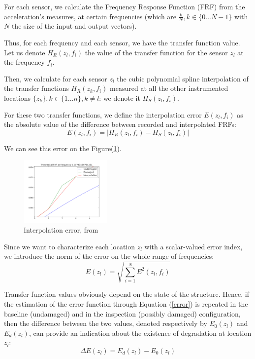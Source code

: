\documentclass[journal]{IEEEtran}
\begin{document}
For each sensor, we calculate the Frequency Response Function (FRF) from the acceleration's measures, at certain frequencies 
(which are $\frac{k}{N}, k \in \{0 ... N-1\}$ with $N$ the size of the input and output vectors).

Thus, for each frequency and each sensor, we have the transfer function value. Let us denote $H_R(z_l,f_i)$ the value of the transfer function for  the sensor $z_l$ at the frequency $f_i$.

Then, we calculate for each sensor $z_l$ the cubic polynomial spline interpolation of the transfer functions $H_R(z_k,f_i)$ measured at all 
the other instrumented locations $\{z_k\}, k\in \{1 ... n\}, k \neq l$: we denote it $H_S(z_l,f_i)$.

For these two transfer functions, we define the interpolation error $E(z_l,f_i)$ as the absolute value of the difference between recorded and interpolated FRFs:
\begin{equation}
E(z_l,f_i) = | H_R(z_l,f_i) - H_S(z_l,f_i) |
\end{equation}

We can see this error on the Figure(\ref{interpolation_error}).


\begin{figure}[h!]
  \centering
  \includegraphics[width=0.4\textwidth]{images/interpolation.png}
  \caption{Interpolation error, from \cite{dilena2015damage}}
  \label{interpolation_error}
\end{figure}

Since we want to characterize each location $z_l$ with a scalar-valued error index, we introduce the norm of the error on the whole range of
frequencies:
\begin{equation}
E(z_l) = \sqrt{  \sum\limits_{i=1}^N  E^2(z_l,f_i) }
\label{error}
\end{equation}


Transfer function values obviously depend on the state of the structure. Hence, if the estimation of the error function
through Equation (\ref{error}) is repeated in the baseline (undamaged) and in the inspection (possibly damaged) configuration, then the
difference between the two values, denoted respectively by $E_0(z_l)$ and $E_d(z_l)$, can provide an indication about the existence of
degradation at location $z_l$:
\begin{equation}
\Delta E(z_l) = E_d(z_l) - E_0(z_l)
\end{equation}
\end{document}

